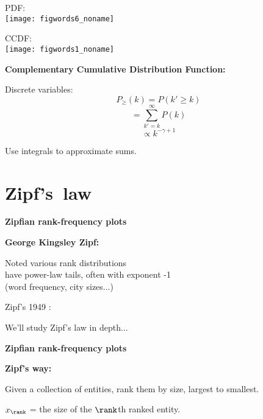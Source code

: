       
      
    
              
        
        PDF:\\
        \texttt{[image: figwords6\_noname]}
        
        CCDF:\\
        \texttt{[image: figwords1\_noname]}
        
          
  

  \textbf{\small Complementary Cumulative Distribution Function:}

  
    
    
      Discrete variables:
      $$ P_\ge(k) = P(k' \ge k) $$
    {
      $$ = \sum_{k'=k}^{\infty} P(k) $$
      }
    {
      $$ \propto k^{-\gamma+1} $$
      }
    
      Use integrals to approximate sums.
    
  


\section{Zipf's\ law}

  \textbf{Zipfian rank-frequency plots}

  \textbf{George Kingsley Zipf:}
    
    
      Noted various rank distributions\\ 
      have power-law tails, often with exponent -1\\
      (word frequency, city sizes...)
    
      Zipf's 1949 :\\
    
          
      
        
     We'll study Zipf's law in depth...
    
  



  \textbf{Zipfian rank-frequency plots}

  \textbf{Zipf's way:}
  
  
    Given a collection of entities, rank them by
    size, largest to smallest.
  
    $x_\rank$ = the size of the $\rank$th ranked entity.
   
